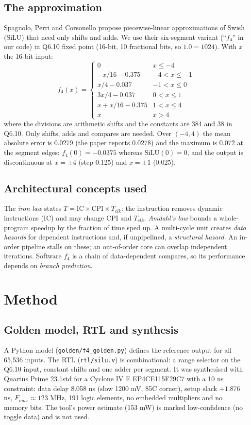 \documentclass[conference]{IEEEtran}
\begin{document}
\subsection{The approximation}
Spagnolo, Perri and Corsonello \cite{spagnolo2025} propose piecewise-linear approximations of Swish (SiLU) that need only shifts and adds. We use their six-segment variant (``$f_4$'' in our code) in Q6.10 fixed point (16-bit, 10 fractional bits, so $1.0=1024$). With $x$ the 16-bit input:
\begin{equation}
f_4(x)=\begin{cases}
0 & x\le -4\\
-x/16-0.375 & -4<x\le -1\\
x/4-0.037 & -1<x\le 0\\
3x/4-0.037 & 0<x\le 1\\
x+x/16-0.375 & 1<x\le 4\\
x & x>4
\end{cases}
\label{eq:f4}
\end{equation}
where the divisions are arithmetic shifts and the constants are 384 and 38 in Q6.10. Only shifts, adds and compares are needed. Over $(-4,4)$ the mean absolute error is 0.0279 (the paper reports 0.0278) and the maximum is 0.072 at the segment edges; $f_4(0)=-0.0375$ whereas $\mathrm{SiLU}(0)=0$, and the output is discontinuous at $x=\pm4$ (step 0.125) and $x=\pm1$ (0.025).

\subsection{Architectural concepts used}
The \emph{iron law} \cite{hennessy} states $T=\mathrm{IC}\times\mathrm{CPI}\times T_{clk}$: the instruction removes dynamic instructions (IC) and may change CPI and $T_{clk}$. \emph{Amdahl's law} \cite{amdahl1967} bounds a whole-program speedup by the fraction of time sped up. A multi-cycle unit creates \emph{data hazards} for dependent instructions and, if unpipelined, a \emph{structural hazard}. An in-order pipeline stalls on these; an out-of-order core can overlap independent iterations. Software $f_4$ is a chain of data-dependent compares, so its performance depends on \emph{branch prediction}.

\section{Method}
\subsection{Golden model, RTL and synthesis}
A Python model (\texttt{golden/f4\_golden.py}) defines the reference output for all 65,536 inputs. The RTL (\texttt{rtl/silu.v}) is combinational: a range selector on the Q6.10 input, constant shifts and one adder per segment. It was synthesised with Quartus Prime 23.1std for a Cyclone IV E EP4CE115F29C7 with a 10 ns constraint: data delay 8.058 ns (slow 1200 mV, 85\textdegree C corner), setup slack $+1.876$ ns, $F_{max}\approx123$ MHz, 191 logic elements, no embedded multipliers and no memory bits. The tool's power estimate (153 mW) is marked low-confidence (no toggle data) and is not used.
\end{document}
